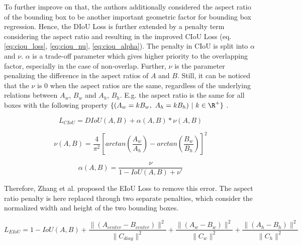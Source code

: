To further improve on that, the authors additionally considered the aspect ratio of the bounding box to be another important geometric factor for bounding box regression.
Hence, the \ac{DIoU} Loss is further extended by a penalty term considering the aspect ratio and resulting in the improved \ac{CIoU} Loss (eq. \ref{eq:ciou_loss}, \ref{eq:ciou_nu}, \ref{eq:ciou_alpha}).
The penalty in \ac{CIoU} is split into $\alpha$ and $\nu$.
$\alpha$ is a trade-off parameter which gives higher priority to the overlapping factor, especially in the case of non-overlap.
Further, $\nu$ is the parameter penalizing the difference in the aspect ratios of $A$ and $B$.
Still, it can be noticed that the $\nu$ is $0$ when the aspect ratios are the same, regardless of the underlying relations between $A_w$, $B_w$ and $A_h$, $B_h$.
E.g. the aspect ratio is the same for all boxes with the following property $\{ (A_w=kB_w, \ A_h=kB_h)\ |\ k \in \R^+\}$ \cite{eiou}.

\begin{equation}
    L_{CIoU} = DIoU(A, B) + \alpha(A,B) * \nu(A, B)
    \label{eq:ciou_loss}
\end{equation}

\begin{equation}
    \nu(A, B) = \frac{4}{\pi^2} [arctan(\frac{A_w}{A_h}) - arctan(\frac{B_w}{B_h})]^2
    \label{eq:ciou_nu}
\end{equation}

\begin{equation}
    \alpha(A, B) = \frac{\nu}{1 - IoU(A, B) + \nu'}
    \label{eq:ciou_alpha}
\end{equation}

Therefore, Zhang et al. \cite{eiou} proposed the \ac{EIoU} Loss to remove this error.
The aspect ratio penalty is here replaced through two separate penalties, which consider the normalized width and height of the two bounding boxes.

\begin{equation}
    L_{EIoU} = 1 - IoU(A, B) + \frac{\|(A_{center} - B_{center})\|^2}{\|C_{diag}\|^2} + \frac{\|(A_{w} - B_{w})\|^2}{\|C_w\|^2} + \frac{\|(A_{h} - B_{h})\|^2}{\|C_h\|^2}
    \label{eq:eiou_loss}
\end{equation}
